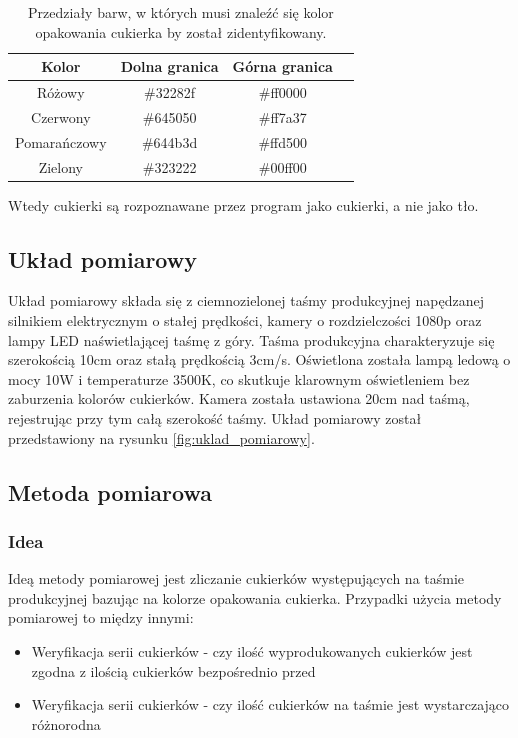 \documentclass{article}
\begin{document}
\begin{table}[H]
    \label{tab:my_label}
    \centering
    \begin{tabular}{ |c|c|c|c| }
     \hline
     Kolor & Dolna granica & Górna granica \\
     \hline
     Różowy & \#32282f & \#ff0000 \\
     \hline
     Czerwony & \#645050 & \#ff7a37 \\
     \hline
     Pomarańczowy & \#644b3d & \#ffd500 \\
     \hline
     Zielony & \#323222 & \#00ff00 \\
     \hline
    \end{tabular}
    \caption{Przedziały barw, w których musi znaleźć się kolor opakowania cukierka by został zidentyfikowany.}
\end{table}

Wtedy cukierki są rozpoznawane przez program jako cukierki, a nie jako tło.

\subsection{Układ pomiarowy}
\label{Układ pomiarowy}

Układ pomiarowy składa się z ciemnozielonej taśmy produkcyjnej napędzanej silnikiem elektrycznym o stałej prędkości, kamery o rozdzielczości 1080p oraz lampy LED naświetlającej taśmę z góry.
Taśma produkcyjna charakteryzuje się szerokością 10cm oraz stałą prędkością 3cm/s. Oświetlona została lampą ledową o mocy 10W i temperaturze 3500K, co skutkuje klarownym oświetleniem bez zaburzenia kolorów cukierków.
Kamera została ustawiona 20cm nad taśmą, rejestrując przy tym całą szerokość taśmy.
Układ pomiarowy został przedstawiony na rysunku \ref{fig:uklad_pomiarowy}.

\subsection{Metoda pomiarowa}
\label{Metoda pomiarowa}
\subsubsection{Idea}
\label{Idea}

Ideą metody pomiarowej jest zliczanie cukierków występujących na taśmie produkcyjnej bazując na kolorze opakowania cukierka. Przypadki użycia metody pomiarowej to między innymi:

\begin{itemize}
    \item Weryfikacja serii cukierków - czy ilość wyprodukowanych cukierków jest zgodna z ilością cukierków bezpośrednio przed
    \item Weryfikacja serii cukierków - czy ilość cukierków na taśmie jest wystarczająco różnorodna
\end{itemize}
\end{document}
